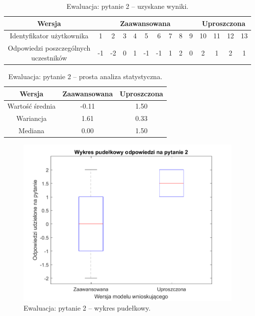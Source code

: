 	\begin{table}[!h]
		\caption{Ewaluacja: pytanie 2 -- uzyskane wyniki.}
		\centering
		\begin{tabular}{|c|c|c|c|c|c|c|c|c|c|c|c|c|c|}
			\hline
			Wersja &  \multicolumn{9}{c|}{Zaawansowana} & \multicolumn{4}{c|}{Uproszczona}\\ \hline
			Identyfikator użytkownika             & 1 & 2 & 3 & 4 & 5 & 6 & 7 & 8 & 9 
			& 10 & 11 & 12 & 13 \\ \hline
			Odpowiedzi poszczególnych uczestników & -1 & -2 & 0 & 1 & -1 & -1 & 1 & 2 & 0
			& 2 & 1 & 2 & 1     \\ \hline
		\end{tabular}
	\end{table}
	
	\begin{table}[!h]
		\caption{Ewaluacja: pytanie 2 -- prosta analiza statystyczna.}
		\centering
		\begin{tabular}{|c|c|c|}
			\hline
			Wersja          & Zaawansowana & Uproszczona \\ \hline
			Wartość średnia & -0.11        & 1.50        \\ \hline
			Wariancja       &  1.61        & 0.33        \\ \hline
			Mediana         &  0.00        & 1.50        \\ \hline
		\end{tabular}
	\end{table}
	
	\begin{figure}[H]
		\centering
		\includegraphics[scale=0.8]{rozdzial5/Ewaluacja2.png}
		\caption{Ewaluacja: pytanie 2 -- wykres pudełkowy.}
	\end{figure}
	
